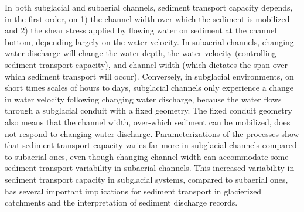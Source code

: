 \documentclass[11pt]{article}
\begin{document}
\laysummary %
In both subglacial and subaerial channels, sediment transport capacity depends, in the first order, on 1) the channel width over which the sediment is mobilized  and 2) the shear stress applied by flowing water on sediment at the channel bottom, depending largely on the water velocity.
In subaerial channels, changing water discharge will change the water depth, the water velocity (controlling sediment transport capacity),  and channel width (which dictates the span over which sediment transport  will occur).
Conversely, in subglacial environments, on short times scales of hours to days, subglacial channels only experience a change in water velocity following changing water discharge, because the water flows through a subglacial conduit with a fixed geometry.
The fixed conduit geometry also means that the channel width, over-which sediment can be mobilized, does not respond to changing water discharge.
Parameterizations of the processes show that sediment transport capacity varies far more in subglacial channels compared to subaerial ones, even though changing channel width can accommodate some sediment transport variability in subaerial channels.
This increased variability in sediment transport capacity in subglacial systems, compared to subaerial ones, has several important implications for sediment transport in glacierized catchments and the interpretation of sediment discharge records.
\end{document}
